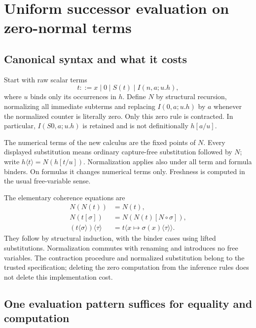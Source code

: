 
\section{Uniform successor evaluation on zero-normal terms}
\label{sec:uniform-step-theory}

\subsection{Canonical syntax and what it costs}

Start with raw scalar terms
\[
 t ::= x\mid 0\mid S(t)\mid I(n,a;u.h),
\]
where $u$ binds only its occurrences in $h$. Define $N$ by structural
recursion, normalizing all immediate subterms and replacing
$I(0,a;u.h)$ by $a$ whenever the normalized counter is literally zero.
Only this zero rule is contracted. In particular,
$I(S0,a;u.h)$ is retained and is not definitionally $h[a/u]$.

The numerical terms of the new calculus are the fixed points of $N$.
Every displayed substitution means ordinary capture-free substitution
followed by $N$; write $h\langle t\rangle=N(h[t/u])$. Normalization applies
also under all term and formula binders. On formulas it changes numerical
terms only. Freshness is computed in the usual free-variable sense.

The elementary coherence equations are
\begin{align*}
 N(N(t))&=N(t),\\
 N(t[\sigma])&=N(N(t)[N\circ\sigma]),\\
 (t\langle\sigma\rangle)\langle\tau\rangle
 &=t\langle x\mapsto\sigma(x)\langle\tau\rangle\rangle.
\end{align*}
They follow by structural induction, with the binder cases using lifted
substitutions. Normalization commutes with renaming and introduces no
free variables. The contraction procedure and normalized substitution
belong to the trusted specification; deleting the zero computation from
the inference rules does not delete this implementation cost.

\subsection{One evaluation pattern suffices for equality and computation}


